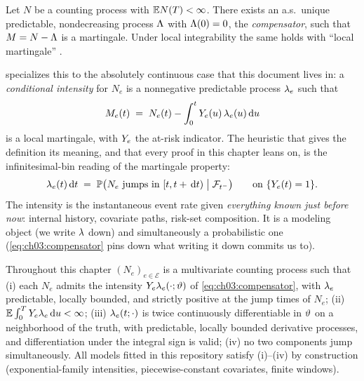 \begin{theorem}\label{thm:ch03:doobmeyer}
Let $N$ be a counting process with $\mathbb{E} N(T) < \infty$. There exists an
a.s.\ unique predictable, nondecreasing process $\Lambda$ with $\Lambda(0)=0$,
the \emph{compensator}, such that $M = N - \Lambda$ is a martingale. Under
local integrability the same holds with ``local martingale''
\citep[Ch.~II]{abgk1993}.
\end{theorem}

 specializes this to the absolutely continuous
case that this document lives in: a \emph{conditional intensity} for $N_e$
is a nonnegative predictable process $\lambda_e$ such that
\begin{equation}\label{eq:ch03:compensator}
M_e(t) \;=\; N_e(t) - \int_0^{t} Y_e(u)\,\lambda_e(u)\,\mathrm{d} u
\end{equation}
is a local martingale, with $Y_e$ the at-risk indicator. The
heuristic that gives the definition its meaning, and that every proof in
this chapter leans on, is the infinitesimal-bin reading of the martingale
property:
\begin{equation}\label{eq:ch03:heuristic}
\lambda_e(t)\,\mathrm{d} t
 \;=\;
 \mathbb{P}\big(N_e \text{ jumps in } [t, t+\,\mathrm{d} t) \;\big|\; \mathcal{F}_{t^-}\big)
 \qquad \text{on } \{Y_e(t) = 1\}.
\end{equation}
The intensity is the instantaneous event rate given \emph{everything known
just before now}: internal history, covariate paths, risk-set composition.
It is a modeling object (we write $\lambda$ down) and simultaneously a
probabilistic one (\cref{eq:ch03:compensator} pins down what writing it
down commits us to).

\begin{assumption}\label{asm:ch03:regularity}
Throughout this chapter $(N_e)_{e\in\mathcal E}$ is a multivariate counting
process such that (i) each $N_e$ admits the intensity
$Y_e\lambda_e(\cdot;\vartheta)$ of \cref{eq:ch03:compensator}, with
$\lambda_e$ predictable, locally bounded, and strictly positive at the jump
times of $N_e$; (ii) $\mathbb{E} \int_0^{T}Y_e\lambda_e\,\mathrm{d} u < \infty$;
(iii) $\lambda_e(t;\cdot)$ is twice continuously differentiable in
$\vartheta$ on a neighborhood of the truth, with predictable, locally
bounded derivative processes, and differentiation under the integral sign
is valid; (iv) no two components jump simultaneously. All models fitted in
this repository satisfy (i)--(iv) by construction (exponential-family
intensities, piecewise-constant covariates, finite windows).
\end{assumption}

